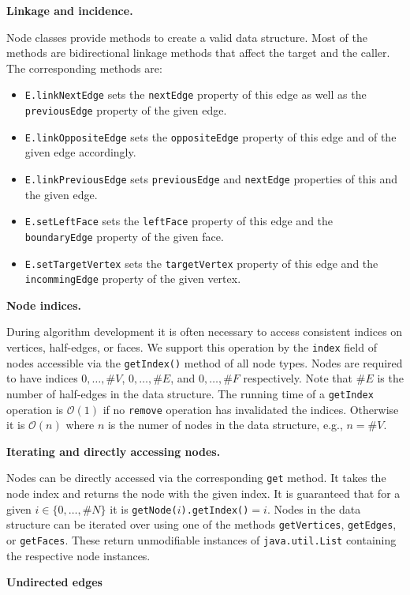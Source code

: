 \documentclass[Thesis.tex]{subfiles}
\begin{document}
{\bf Linkage and incidence.}

Node classes provide methods to create a valid data structure. Most of the methods are bidirectional linkage methods that affect the target and the caller. The corresponding methods are:
\begin{itemize}
\item {\tt E.linkNextEdge} sets the {\tt nextEdge} property of this edge as well as the 
{\tt previousEdge} property of the given edge.
\item {\tt E.linkOppositeEdge} sets the {\tt oppositeEdge} property of this edge and of the given edge accordingly.
\item {\tt E.linkPreviousEdge} sets {\tt previousEdge} and {\tt nextEdge} properties of this and the given edge.
\item {\tt E.setLeftFace} sets the {\tt leftFace} property of this edge and the {\tt boundaryEdge} property of the given face.
\item {\tt E.setTargetVertex} sets the {\tt targetVertex} property of this edge and the 
{\tt incommingEdge} property of the given vertex.
\end{itemize}

{\bf Node indices.}

During algorithm development it is often necessary to access consistent indices on vertices,
half-edges, or faces. We support this operation by the {\tt index} field of nodes accessible via
the {\tt getIndex()} method of all node types. Nodes are required to have indices $0,\ldots,\#V$,
$0,\ldots,\#E$, and $0,\ldots,\#F$ respectively. Note that $\#E$ is the number of half-edges
in the data structure. The running time of a {\tt getIndex} operation is $\mathcal{O}(1)$ if
no {\tt remove} operation has invalidated the indices. Otherwise it is $\mathcal{O}(n)$ where
$n$ is the numer of nodes in the data structure, e.g., $n=\#V$.

{\bf Iterating and directly accessing nodes.}

Nodes can be directly accessed via the corresponding {\tt get} method. It takes the node index
and returns the node with the given index. It is guaranteed that for a given $i\in \{0,\ldots,\#N\}$
it is {\tt getNode($i$).getIndex()$ = i$}.
Nodes in the data structure can be iterated over using one of the methods {\tt getVertices}, 
{\tt getEdges}, or {\tt getFaces}. These return unmodifiable instances of {\tt java.util.List} containing the respective node instances.

{\bf Undirected edges}
\end{document}
